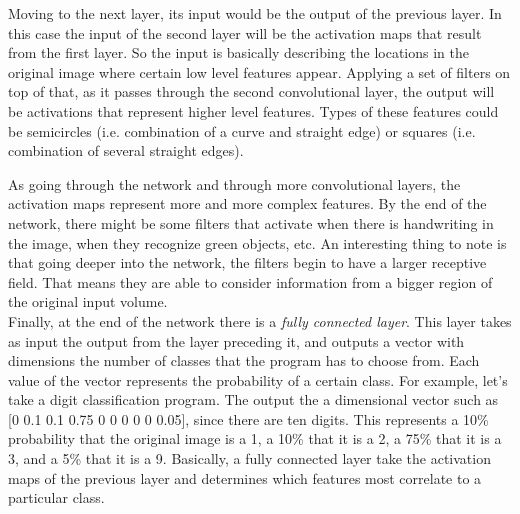 \documentclass[12pt,a4paper,table,dvipsnames,tikz]{report}
\newcommand{\term}{\textit}
\begin{document}
	Moving to the next layer, its input would be the output of the previous layer. 
	In this case the input of the second layer will be the activation maps that result 
	from the first layer. So the input is basically describing the locations in the 
	original image where certain low level features appear. Applying a set of filters 
	on top of that, as it passes through the second convolutional layer, the output 
	will be activations that represent higher level features. Types of these features 
	could be semicircles (i.e. combination of a curve and straight edge) or squares 
	(i.e. combination of several straight edges).
	\par
	As going through the network and through more convolutional layers, the activation 
	maps represent more and more complex features. By the end of the network, there 
	might be some filters that activate when there is handwriting in the image, when 
	they recognize green objects, etc. An interesting thing to note is that going deeper 
	into the network, the filters begin to have a larger receptive field. That means 
	they are able to consider information from a bigger region of the original input 
	volume.
	\\
	
	Finally, at the end of the network there is a \term{fully connected layer}. This 
	layer takes as input the output from the layer preceding it, and outputs a vector 
	with dimensions the number of classes that the program has to choose from. Each 
	value of the vector represents the probability of a certain class.	For example, 
	let's take a digit classification program. The output the a dimensional vector 
	such as [0 0.1 0.1 0.75 0 0 0 0 0 0.05], since there are ten digits. This represents 
	a 10\% probability that the original image is a 1, a 10\% that it is a 2, a 75\% 
	that it is a 3, and a 5\% that it is a 9. Basically, a fully connected layer take 
	the activation maps of the previous layer and determines which features most 
	correlate to a particular class.
	\\
	
	
	\renewcommand{\bibname}{References}
	
	
\end{document}

